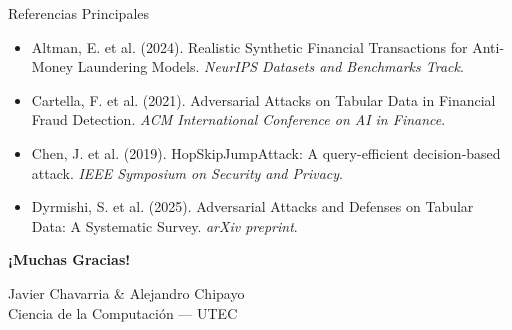 \documentclass[aspectratio=169, 8pt]{beamer}
\begin{document}
\begin{frame}{Referencias Principales}
\footnotesize
\begin{itemize}
    \item Altman, E. et al. (2024). Realistic Synthetic Financial Transactions for Anti-Money Laundering Models. \textit{NeurIPS Datasets and Benchmarks Track}.
    \item Cartella, F. et al. (2021). Adversarial Attacks on Tabular Data in Financial Fraud Detection. \textit{ACM International Conference on AI in Finance}.
    \item Chen, J. et al. (2019). HopSkipJumpAttack: A query-efficient decision-based attack. \textit{IEEE Symposium on Security and Privacy}.
    \item Dyrmishi, S. et al. (2025). Adversarial Attacks and Defenses on Tabular Data: A Systematic Survey. \textit{arXiv preprint}.
\end{itemize}
\end{frame}

\begin{frame}
    \centering
    \Huge \textbf{¡Muchas Gracias!}

    \vspace{1cm}
    \normalsize
    Javier Chavarria \& Alejandro Chipayo \\
    \vspace{0.2cm}
    \footnotesize{Ciencia de la Computación --- UTEC}
\end{frame}
\end{document}
